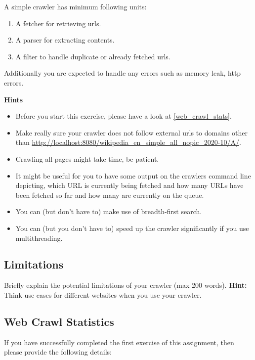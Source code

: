 \documentclass{resources/WeSTassignment}
\begin{document}
A simple crawler has minimum following units:\\
\begin{enumerate}
    \item A fetcher for retrieving urls.
    \item A parser for extracting contents.
    \item A filter to handle duplicate or already fetched urls.
\end{enumerate}
Additionally you are expected to handle any errors such as memory leak, http errors. 

\textbf{Hints} \\

\begin{itemize}
    \item Before you start this exercise, please have a look at \ref{web_crawl_stats}. 
    \item Make really sure your crawler does not follow external urls to domains other than \url{http://localhost:8080/wikipedia_en_simple_all_nopic_2020-10/A/}.
    \item Crawling all pages might take time, be patient.
    \item It might be useful for you to have some output on the crawlers command line depicting, which URL is currently being fetched and how many URLs have been fetched so far and how many are currently on the queue.
    \item  You can (but don’t have to) make use of breadth-first search.
    \item You can (but you don’t have to) speed up the crawler significantly if you use multithreading.
\end{itemize}

\subsection{Limitations} 
Briefly explain the potential limitations of your crawler (max 200 words). \textbf{Hint:} Think use cases for different websites when you use your crawler.

\subsection{Web Crawl Statistics\label{web_crawl_stats}}

If you have successfully completed the first exercise of this assignment, then please provide the following details:
\end{document}
